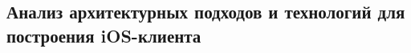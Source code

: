 \subsection{Анализ архитектурных подходов и технологий для построения iOS-клиента}
\label{sec:analysis:research:mobArch}